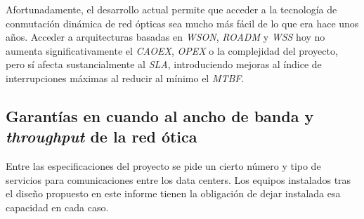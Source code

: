 Afortunadamente, el desarrollo actual permite que acceder a la
tecnología de conmutación dinámica de red ópticas sea mucho más fácil
de lo que era hace unos años. Acceder a arquitecturas basadas en
\emph{WSON}, \emph{ROADM} y \emph{WSS} hoy no aumenta
significativamente el \emph{CAOEX}, \emph{OPEX} o la complejidad del
proyecto, pero sí afecta sustancialmente al \emph{SLA}, introduciendo
mejoras al índice de interrupciones máximas al reducir al mínimo el
\emph{MTBF}.

\subsection{Garantías en cuando al ancho de banda y \emph{throughput} de la red ótica}
\label{sec:anchodebanda}

Entre las especificaciones del proyecto se pide un cierto número y
tipo de servicios para comunicaciones entre los data centers. Los
equipos instalados tras el diseño propuesto en este informe tienen la
obligación de dejar instalada esa capacidad en cada caso.
